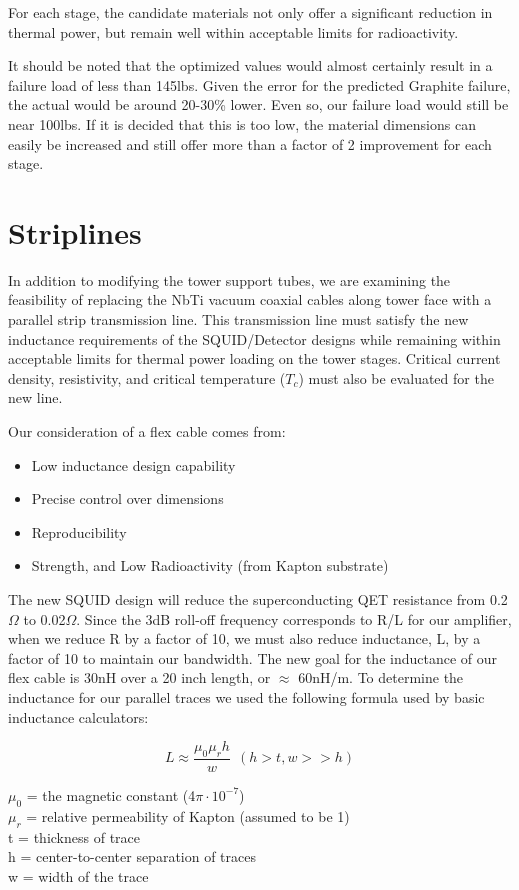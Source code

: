 \documentclass{report}
\begin{document}
\begin{multicols}{2}
\bigskip

For each stage, the candidate materials not only offer a significant reduction in thermal power, but remain well within acceptable limits for radioactivity.

It should be noted that the optimized values would almost certainly result in a failure load of less than 145lbs. Given the error for the predicted Graphite failure, the actual
would be around 20-30\% lower. Even so, our failure load would still be near 100lbs. If it is decided that this is too low, the material dimensions can easily be increased and
still offer more than a factor of 2 improvement for each stage.

\section{Striplines}
In addition to modifying the tower support tubes, we are examining the feasibility of replacing the NbTi vacuum coaxial cables along tower face with a parallel strip transmission
line. This transmission line must satisfy the new inductance requirements of the SQUID/Detector designs while remaining within acceptable limits for thermal power loading on the
tower stages. Critical current density, resistivity, and critical temperature ($T_{c}$) must also be evaluated for the new line.

Our consideration of a flex cable comes from:
\begin{itemize}
\item Low inductance design capability
\item Precise control over dimensions
\item Reproducibility
\item Strength, and Low Radioactivity (from Kapton substrate)
\end{itemize}

The new SQUID design will reduce the superconducting QET resistance from 0.2$\Omega$ to 0.02$\Omega$. Since the 3dB roll-off frequency corresponds to R/L for our amplifier, when we reduce R by a factor of 10, we must also reduce inductance, L, by a factor of 10 to maintain our bandwidth. The new goal for the inductance of our flex cable is 30nH over a 20 inch length, or $\approx$ 60nH/m. To determine the inductance for our parallel traces we used the following formula used by basic inductance calculators:

$$ L \approx \frac{\mu_{0}\mu_{r}h}{w} \ \ (h > t , w >> h)$$

$\mu_{0}$ = the magnetic constant (4$\pi \cdot 10^{-7}$)\\
$\mu_{r}$ = relative permeability of Kapton (assumed to be 1)\\
t = thickness of trace \\
h = center-to-center separation of traces \\
w = width of the trace \\


\end{multicols}
\end{document}
